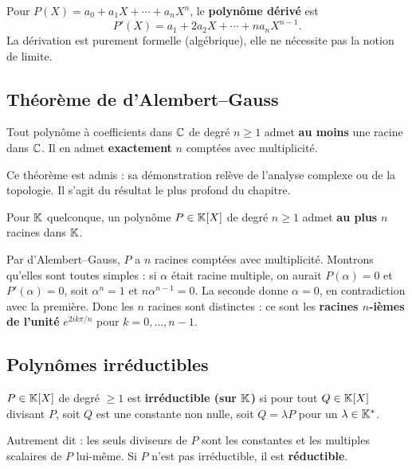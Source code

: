 \begin{rembox}
Pour $P(X) = a_0 + a_1 X + \cdots + a_n X^n$, le \textbf{polynôme dérivé} est
\[
  P'(X) = a_1 + 2 a_2 X + \cdots + n a_n X^{n-1}.
\]
La dérivation est purement formelle (algébrique), elle ne nécessite pas la notion de limite.
\end{rembox}

\subsection{Théorème de d'Alembert--Gauss}

\begin{thmbox}
Tout polynôme à coefficients dans $\C$ de degré $n \geqslant 1$ admet \textbf{au moins} une racine dans $\C$. Il en admet \textbf{exactement} $n$ comptées avec multiplicité.
\end{thmbox}

\begin{rembox}
Ce théorème est admis : sa démonstration relève de l'analyse complexe ou de la topologie. Il s'agit du résultat le plus profond du chapitre.
\end{rembox}

\begin{thmbox}
Pour $\mathbb{K}$ quelconque, un polynôme $P \in \mathbb{K}[X]$ de degré $n \geqslant 1$ admet \textbf{au plus} $n$ racines dans $\mathbb{K}$.
\end{thmbox}

\begin{exbox}[$P(X) = X^n - 1$ a $n$ racines distinctes dans $\C$]
Par d'Alembert--Gauss, $P$ a $n$ racines comptées avec multiplicité. Montrons qu'elles sont toutes simples : si $\alpha$ était racine multiple, on aurait $P(\alpha) = 0$ et $P'(\alpha) = 0$, soit $\alpha^n = 1$ et $n \alpha^{n-1} = 0$. La seconde donne $\alpha = 0$, en contradiction avec la première. Donc les $n$ racines sont distinctes : ce sont les \textbf{racines $n$-ièmes de l'unité} $e^{2 i k \pi / n}$ pour $k = 0, \ldots, n-1$.
\end{exbox}

\subsection{Polynômes irréductibles}

\begin{defbox}
$P \in \mathbb{K}[X]$ de degré $\geqslant 1$ est \textbf{irréductible (sur $\mathbb{K}$)} si pour tout $Q \in \mathbb{K}[X]$ divisant $P$, soit $Q$ est une constante non nulle, soit $Q = \lambda P$ pour un $\lambda \in \mathbb{K}^*$.

Autrement dit : les seuls diviseurs de $P$ sont les constantes et les multiples scalaires de $P$ lui-même. Si $P$ n'est pas irréductible, il est \textbf{réductible}.
\end{defbox}

